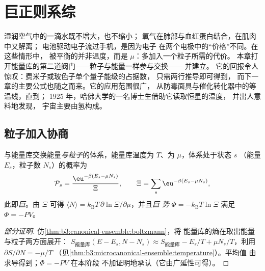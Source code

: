 \chapter{巨正则系综}\label{ch:b3:grand-canonical}

湿润空气中的一滴水既不增大，也不缩小；
氧气在肺部与血红蛋白结合，在肌肉中又解离；
电池驱动电子流过手机，是因为电子
在两个电极中的“价格”不同。在这些情形中，
被平衡的并非温度，而是\emph{}
$\mu$：多加入一个粒子所需的代价。
本章打开能量库的第二道阀门——粒子与能量一样参与交换——
并建立。
它的回报令人惊叹：费米子或玻色子单个量子能级的占据数，
只需两行推导即可得到，
而下一章的主要公式也随之而来。它的应用范围很广，
从防毒面具与催化转化器中的等温线，直到；
1925 年，哈佛大学的一名博士生借助它读取恒星的温度，
并出人意料地发现，
宇宙主要由氢构成。

\section{粒子加入协商}

\begin{theorem}[巨正则分布]\label{thm:b3:grand-canonical:distribution}
与能量库交换能量\emph{与粒子}的体系，能量库温度为
$T$、为 $\mu$，体系处于状态 $s$
（能量 $E_s$，粒子数 $N_s$）的概率为
\[
\mathcal P_s = \frac{\eu^{-\beta(E_s - \mu N_s)}}{\Xi} , \qquad
\Xi = \sum_s\eu^{-\beta(E_s - \mu N_s)} ,
\]
此即\emph{巨}。由 $\Xi$ 可得 $\langle N\rangle
= k_{\text{B}}T\,\partial\ln\Xi/\partial\mu$，并且\emph{巨
势} $\Phi = -k_{\text{B}}T\ln\Xi$ 满足 $\Phi = -PV$。
\end{theorem}

\begin{proof}[部分证明]
仿\cref{thm:b3:canonical-ensemble:boltzmann}，将
能量库的熵在取出能量与粒子两方面展开：
$S_{\text{能量库}}(E - E_s, N - N_s) \approx S_{\text{能量库}} - E_s/T +
\mu N_s/T$，利用 $\partial S/\partial N = -\mu/T$
（见\cref{thm:b3:microcanonical-ensemble:temperature}）。平均值
由求导得到；$\Phi = -PV$ 在本阶段
不加证明地承认（它由广延性可得）。
\end{proof}

